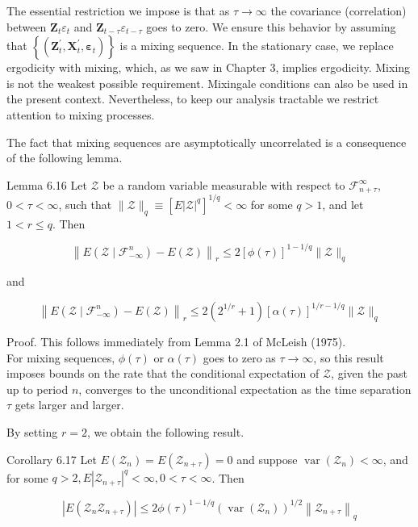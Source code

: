 \documentclass[10pt]{article}
\begin{document}
The essential restriction we impose is that as $\tau \rightarrow \infty$ the covariance (correlation) between $\mathbf{Z}_{t} \varepsilon_{t}$ and $\mathbf{Z}_{t-\tau} \varepsilon_{t-\tau}$ goes to zero. We ensure this behavior by assuming that $\left\{\left(\mathbf{Z}_{t}^{\prime}, \mathbf{X}_{t}^{\prime}, \boldsymbol{\varepsilon}_{t}\right)\right\}$ is a mixing sequence. In the stationary case, we replace ergodicity with mixing, which, as we saw in Chapter 3, implies ergodicity. Mixing is not the weakest possible requirement. Mixingale conditions can also be used in the present context. Nevertheless, to keep our analysis tractable we restrict attention to mixing processes.

The fact that mixing sequences are asymptotically uncorrelated is a consequence of the following lemma.

Lemma 6.16 Let $\mathcal{Z}$ be a random variable measurable with respect to $\mathcal{F}_{n+\tau}^{\infty}$, $0<\tau<\infty$, such that $\|\mathcal{Z}\|_{q} \equiv\left[E|\mathcal{Z}|^{q}\right]^{1 / q}<\infty$ for some $q>1$, and let $1<r \leq q$. Then

$$
\left\|E\left(\mathcal{Z} \mid \mathcal{F}_{-\infty}^{n}\right)-E(\mathcal{Z})\right\|_{r} \leq 2[\phi(\tau)]^{1-1 / q}\|\mathcal{Z}\|_{q}
$$

and

$$
\left\|E\left(\mathcal{Z} \mid \mathcal{F}_{-\infty}^{n}\right)-E(\mathcal{Z})\right\|_{r} \leq 2\left(2^{1 / r}+1\right)[\alpha(\tau)]^{1 / r-1 / q}\|\mathcal{Z}\|_{q}
$$

Proof. This follows immediately from Lemma 2.1 of McLeish (1975).\\
For mixing sequences, $\phi(\tau)$ or $\alpha(\tau)$ goes to zero as $\tau \rightarrow \infty$, so this result imposes bounds on the rate that the conditional expectation of $\mathcal{Z}$, given the past up to period $n$, converges to the unconditional expectation as the time separation $\tau$ gets larger and larger.

By setting $r=2$, we obtain the following result.

Corollary 6.17 Let $E\left(\mathcal{Z}_{n}\right)=E\left(\mathcal{Z}_{n+\tau}\right)=0$ and suppose $\operatorname{var}\left(\mathcal{Z}_{n}\right)<\infty$, and for some $q>2, E\left|\mathcal{Z}_{n+\tau}\right|^{q}<\infty, 0<\tau<\infty$. Then

$$
\left|E\left(\mathcal{Z}_{n} \mathcal{Z}_{n+\tau}\right)\right| \leq 2 \phi(\tau)^{1-1 / q}\left(\operatorname{var}\left(\mathcal{Z}_{n}\right)\right)^{1 / 2}\left\|\mathcal{Z}_{n+\tau}\right\|_{q}
$$
\end{document}
